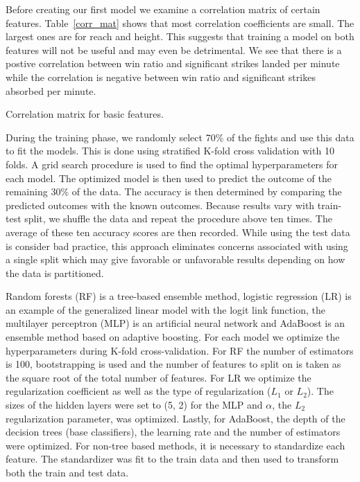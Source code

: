 Before creating our first model we examine a correlation
matrix of certain features. Table~\ref{corr_mat} shows that
most correlation coefficients are small. The largest ones
are for reach and height. This suggests that training a model
on both features will not be useful and may even be
detrimental. We see that there is a postive
correlation between win ratio and significant strikes landed
per minute while the correlation is negative between win ratio
and significant strikes absorbed per minute.

\begin{center}
\begin{table}[h]

\caption{Correlation matrix for basic features.}
\label{corr_mat}
\end{table}
\end{center}

During the training phase, we randomly select 70\% of the fights
and use this data to fit the models. This is done using
stratified K-fold cross validation with 10 folds. A grid search
procedure is used to find the optimal hyperparameters for each
model. The optimized model is then used to predict the outcome
of the remaining 30\% of the data. The accuracy is then determined
by comparing the predicted outcomes with the known outcomes.
Because results vary with train-test split, we shuffle the
data and repeat the procedure above ten times. The average
of these ten accuracy scores are then recorded.
While using the
test data is consider bad practice, this approach eliminates
concerns associated with using a single split which may give
favorable or unfavorable results depending on how the data
is partitioned.

Random forests (RF) is a tree-based ensemble method,
logistic regression (LR) is an example of the generalized
linear model with the logit link function, the multilayer perceptron (MLP)
is an artificial neural network and AdaBoost is
an ensemble method based on adaptive boosting.
For each model we optimize the hyperparameters
during K-fold cross-validation. For RF the
number of estimators is 100, bootstrapping is used
and the number of features to split on is taken
as the square root of the total number of features.
For LR we optimize the regularization coefficient
as well as the type of regularization ($L_1$ or $L_2$).
The sizes of the hidden layers were set to (5, 2) for
the MLP and $\alpha$, the $L_2$ regularization parameter, was optimized.
Lastly, for AdaBoost, the depth of the decision trees
(base classifiers), the learning rate and the number
of estimators were optimized.
For non-tree based methods, it is necessary to standardize
each feature. The standardizer was fit to the train data
and then used to transform both the train and test data.

